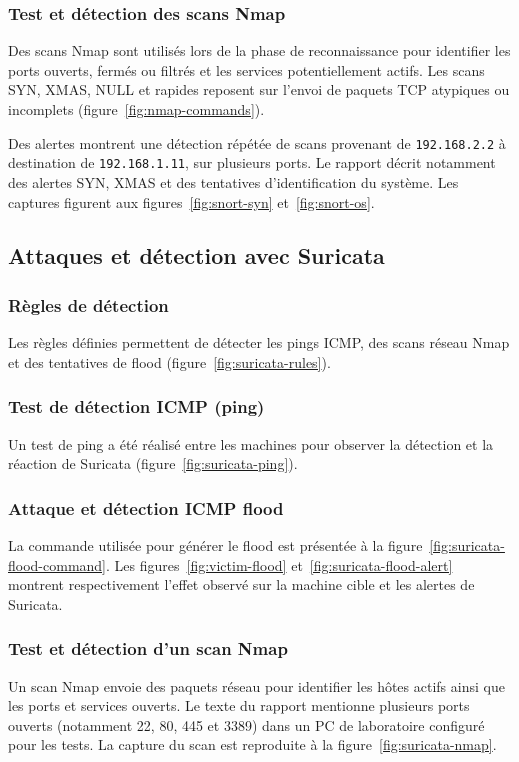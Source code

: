 \subsubsection{Test et détection des scans Nmap}
Des scans Nmap sont utilisés lors de la phase de reconnaissance pour identifier les ports ouverts, fermés ou filtrés et les services potentiellement actifs. Les scans SYN, XMAS, NULL et rapides reposent sur l'envoi de paquets TCP atypiques ou incomplets (figure~\ref{fig:nmap-commands}).

Des alertes montrent une détection répétée de scans provenant de \texttt{192.168.2.2} à destination de \texttt{192.168.1.11}, sur plusieurs ports. Le rapport décrit notamment des alertes SYN, XMAS et des tentatives d'identification du système. Les captures figurent aux figures~\ref{fig:snort-syn} et~\ref{fig:snort-os}.
\FloatBarrier

\subsection{Attaques et détection avec Suricata}
\subsubsection{Règles de détection}
Les règles définies permettent de détecter les pings ICMP, des scans réseau Nmap et des tentatives de flood (figure~\ref{fig:suricata-rules}).

\subsubsection{Test de détection ICMP (ping)}
Un test de ping a été réalisé entre les machines pour observer la détection et la réaction de Suricata (figure~\ref{fig:suricata-ping}).

\subsubsection{Attaque et détection ICMP flood}
La commande utilisée pour générer le flood est présentée à la figure~\ref{fig:suricata-flood-command}. Les figures~\ref{fig:victim-flood} et~\ref{fig:suricata-flood-alert} montrent respectivement l'effet observé sur la machine cible et les alertes de Suricata.

\subsubsection{Test et détection d'un scan Nmap}
Un scan Nmap envoie des paquets réseau pour identifier les hôtes actifs ainsi que les ports et services ouverts. Le texte du rapport mentionne plusieurs ports ouverts (notamment 22, 80, 445 et 3389) dans un PC de laboratoire configuré pour les tests. La capture du scan est reproduite à la figure~\ref{fig:suricata-nmap}.
\FloatBarrier
